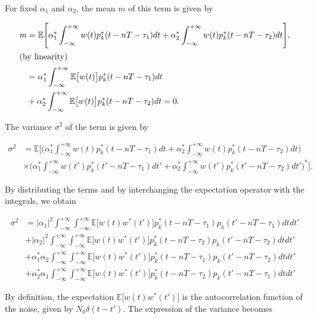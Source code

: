 \documentclass [a4paper, 11pt] {article}
\begin{document}
\begin{solution}
\begin{enumerate}
For fixed $\alpha_1$ and $\alpha_2$, the mean $m$ of this term is given by

\begin{align}
    m &= \mathbb{E}\Bigg[\alpha^*_1 \int_{-\infty}^{+\infty} w(t)p_k^*(t-nT-\tau_{1})dt + \alpha^*_2 \int_{-\infty}^{+\infty} w(t)p_k^*(t-nT-\tau_{2})dt \Bigg],\\ \intertext{(by linearity)}
    &= \alpha^*_1 \int_{-\infty}^{+\infty} \mathbb{E}\big[w(t)\big]p_k^*(t-nT-\tau_{1})dt \\
    &+ \alpha^*_2 \int_{-\infty}^{+\infty} \mathbb{E}\big[w(t)\big]p_k^*(t-nT-\tau_{2})dt = 0. \nonumber
\end{align}

The variance $\sigma^2$ of the term is given by

\begin{align}
\sigma^2 &= \mathbb{E}\Bigg[\bigg(\alpha^*_1 \int_{-\infty}^{+\infty} w(t)p_k^*(t-nT-\tau_{1})dt + \alpha^*_2 \int_{-\infty}^{+\infty} w(t)p_k^*(t-nT-\tau_{2})dt\bigg) \\
& \times \bigg( \alpha^*_1 \int_{-\infty}^{+\infty} w(t')p_k^*(t'-nT-\tau_{1})dt' + \alpha^*_2 \int_{-\infty}^{+\infty} w(t')p_k^*(t'-nT-\tau_{2})dt'\bigg)^*\bigg].\nonumber
\end{align}

By distributing the terms and by interchanging the expectation operator with the integrals, we obtain

\begin{align}
\sigma^2 &= |\alpha_1|^2 \int_{-\infty}^{+\infty}\int_{-\infty}^{+\infty}\mathbb{E}\big[w(t)w^*(t')\big]p_k^*(t-nT-\tau_{1})p_k(t'-nT-\tau_{1})dtdt' \\
&+ |\alpha_2|^2 \int_{-\infty}^{+\infty}\int_{-\infty}^{+\infty}\mathbb{E}\big[w(t)w^*(t')\big]p_k^*(t-nT-\tau_{2})p_k(t'-nT-\tau_{2})dtdt' \nonumber\\
&+ \alpha_1^*\alpha_2 \int_{-\infty}^{+\infty}\int_{-\infty}^{+\infty}\mathbb{E}\big[w(t)w^*(t')\big]p_k^*(t-nT-\tau_{1})p_k(t'-nT-\tau_{2})dtdt' \nonumber\\
&+ \alpha_2^*\alpha_1 \int_{-\infty}^{+\infty}\int_{-\infty}^{+\infty}\mathbb{E}\big[w(t)w^*(t')\big]p_k^*(t-nT-\tau_{2})p_k(t'-nT-\tau_{1})dtdt'\nonumber
\end{align}

By definition, the expectation $\mathbb{E}\big[w(t)w^*(t')\big]$ is the autocorrelation function of the noise, given by $N_0\delta(t-t')$. The expression of the variance becomes


\end{enumerate}
\end{solution}
\end{document}
